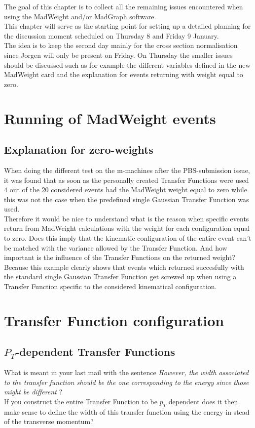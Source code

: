 The goal of this chapter is to collect all the remaining issues encountered when using the MadWeight and/or MadGraph software.\\
This chapter will serve as the starting point for setting up a detailed planning for the discussion moment scheduled on Thursday 8 and Friday 9 January.\\
The idea is to keep the second day mainly for the cross section normalisation since Jorgen will only be present on Friday. On Thursday the smaller issues should be discussed such as for example the different variables defined in the new MadWeight card and the explanation for events returning with weight equal to zero.

\section{Running of MadWeight events}

\subsection{Explanation for zero-weights}
When doing the different test on the m-machines after the PBS-submission issue, it was found that as soon as the personally created Transfer Functions were used $4$ out of the $20$ considered events had the MadWeight weight equal to zero while this was not the case when the predefined single Gaussian Transfer Function was used.\\
Therefore it would be nice to understand what is the reason when specific events return from MadWeight calculations with the weight for each configuration equal to zero. Does this imply that the kinematic configuration of the entire event can't be matched with the variance allowed by the Transfer Function. And how important is the influence of the Transfer Functions on the returned weight?\\
Because this example clearly shows that events which returned succesfully with the standard single Gaussian Transfer Function get screwed up when using a Transfer Function specific to the considered kinematical configuration.

\section{Transfer Function configuration}

\subsection{$P_{T}$-dependent Transfer Functions}
What is meant in your last mail with the sentence \textit{However, the width associated to the transfer function should be the one corresponding to the energy since those might be different} ?\\
If you construct the entire Transfer Function to be $p_{T}$ dependent does it then make sense to define the width of this transfer function using the energy in stead of the transverse momentum?